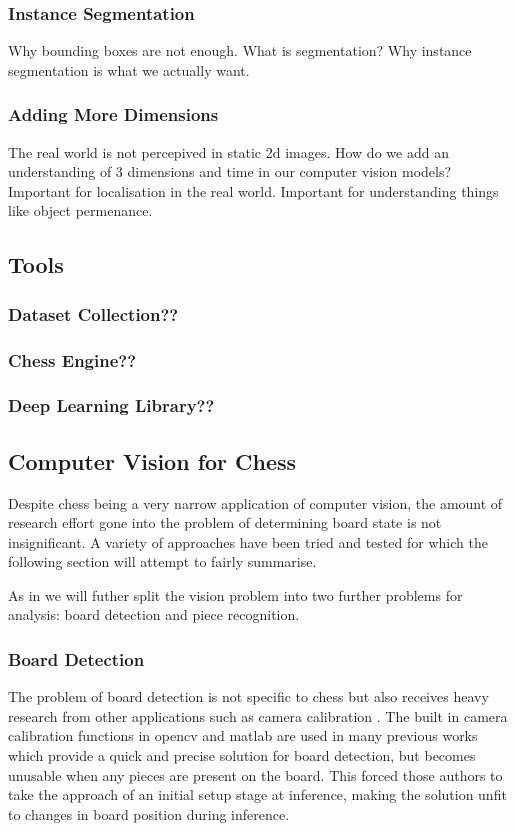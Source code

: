 \subsubsection{Instance Segmentation}
Why bounding boxes are not enough.  What is segmentation? Why instance segmentation is what we actually want. \cite{}
\subsubsection{Adding More Dimensions}
The real world is not percepived in static 2d images.  How do we add an understanding of 3 dimensions and time in our computer vision models? \cite{}
Important for localisation in the real world.  Important for understanding things like object permenance.

\subsection{Tools}
\subsubsection{Dataset Collection??}
\subsubsection{Chess Engine??}
\subsubsection{Deep Learning Library??}

\subsection{Computer Vision for Chess}
Despite chess being a very narrow application of computer vision, the amount of research effort gone into the problem of determining 
board state is not insignificant. 
A variety of approaches have been tried and tested for which the following section will attempt to fairly summarise.

As in \cite{} we will futher split the vision problem into two further problems for analysis: board detection and piece recognition.

\subsubsection{Board Detection}
The problem of board detection is not specific to chess but also receives heavy research from other applications such as camera calibration \cite{}. 
The built in camera calibration functions in opencv \cite{} and matlab \cite{} are used in many previous works \cite{} which 
provide a quick and precise solution for board detection, but becomes unusable when any pieces are present on the board.  This forced those authors to 
take the approach of an initial setup stage at inference, making the solution unfit to changes in board position during inference. 

